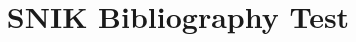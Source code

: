 \documentclass{article}
\begin{document}
\title{SNIK Bibliography Test}
\maketitle
\nocite{*}


\end{document}
